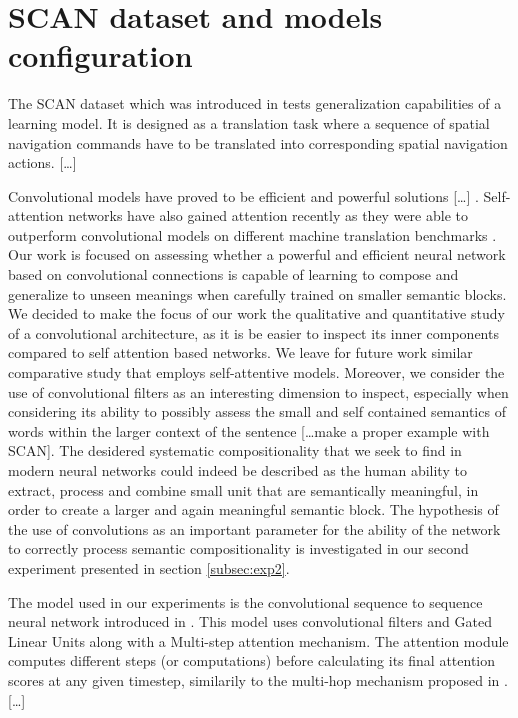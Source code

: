 \section{SCAN dataset and models configuration}
\label{sec:setup}

The SCAN dataset which was introduced in \cite{Lake:Baroni:2017} tests generalization capabilities of a learning model.
It is designed as a translation task where a sequence of spatial navigation commands have to be translated into corresponding 
spatial navigation actions. [\dots] 

Convolutional models have proved to be efficient and powerful solutions [\dots] \cite{kalchbrenner:etal:2016, gehring:etal:2017}.
Self-attention networks have also gained attention recently as they were able to outperform convolutional models on different
machine translation benchmarks \cite{chen:etal:2018,vaswani:etal:2017}.
Our work is focused on assessing whether a powerful and efficient neural network based on convolutional connections
is capable of learning to compose and generalize to unseen meanings when carefully trained on smaller semantic blocks.
We decided to make the focus of our work the qualitative and quantitative study of a convolutional architecture, as
it is be easier to inspect its inner components compared to self attention based networks.
We leave for future work similar comparative study that employs self-attentive models.
Moreover, we consider the use of convolutional filters as an interesting dimension to inspect, especially when considering 
its ability to possibly assess the small and self contained semantics of words within the larger context of the sentence [\dots make a proper example with SCAN].
The desidered systematic compositionality that we seek to find in modern neural networks could indeed be described as the
human ability to extract, process and combine small unit that are semantically meaningful, in order to create a larger and again meaningful semantic block.
The hypothesis of the use of convolutions as an important parameter for the ability of the network
to correctly process semantic compositionality is investigated in our second experiment presented in section \ref{subsec:exp2}.

The model used in our experiments is the convolutional sequence to sequence neural network introduced in \cite{gehring:etal:2017}.
This model uses convolutional filters and Gated Linear Units \cite{dauphin:etal:2016} along with a Multi-step attention mechanism.
The attention module computes different steps (or computations) before calculating its final attention scores at any given timestep, similarily 
to the multi-hop mechanism proposed in \cite{sukhbaatar:etal:2105}.
[\dots]
